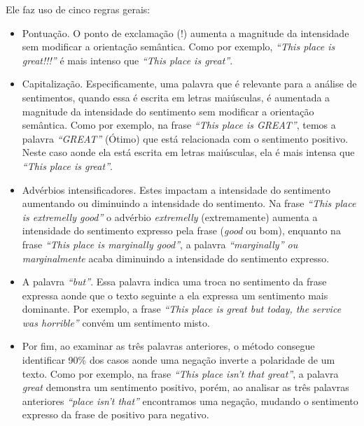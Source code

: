 Ele faz uso de cinco regras gerais:


\begin{itemize}
  \item Pontuação. O ponto de exclamação (!) aumenta a magnitude da
  intensidade sem modificar a orientação semântica. Como por exemplo,
  \textit{``This place is great!!!''} é mais intenso que \textit{``This place
  is great''}.
  \item Capitalização. Especificamente, uma palavra que é relevante para a
  análise de sentimentos, quando essa é escrita em letras maiúsculas, é
  aumentada a magnitude da intensidade do sentimento sem modificar a orientação
  semântica. Como por exemplo, na frase \textit{``This place is GREAT''}, temos
  a palavra \textit{``GREAT''} (Ótimo) que está relacionada com o sentimento
  positivo. Neste caso aonde ela está escrita em letras maiúsculas, ela é mais
  intensa que \textit{``This place is great''}.
  \item Advérbios intensificadores. Estes impactam a intensidade do sentimento
  aumentando ou diminuindo a intensidade do sentimento. Na frase \textit{``This
  place is extremelly good''} o advérbio \textit{extremelly} (extremamente)
  aumenta a intensidade do sentimento expresso pela frase (\textit{good} ou
  bom), enquanto na frase \textit{``This place is marginally good''}, a palavra
  \textit{``marginally'' ou marginalmente} acaba diminuindo a intensidade do
  sentimento expresso.
  \item A palavra \textit{``but''}. Essa palavra indica uma troca no sentimento
  da frase expressa aonde que o texto seguinte a ela expressa um sentimento mais
  dominante. Por exemplo, a frase \textit{``This place is great but today, the
  service was horrible''} convém um sentimento misto.
  \item Por fim, ao examinar as três palavras anteriores, o método consegue
  identificar 90\% dos casos aonde uma negação inverte a polaridade de um texto.
  Como por exemplo, na frase \textit{``This place isn't that great''}, a
  palavra \textit{great} demonstra um sentimento positivo, porém, ao analisar
  as três palavras anteriores \textit{``place isn't that''} encontramos uma
  negação, mudando o sentimento expresso da frase de positivo para negativo.
\end{itemize}

